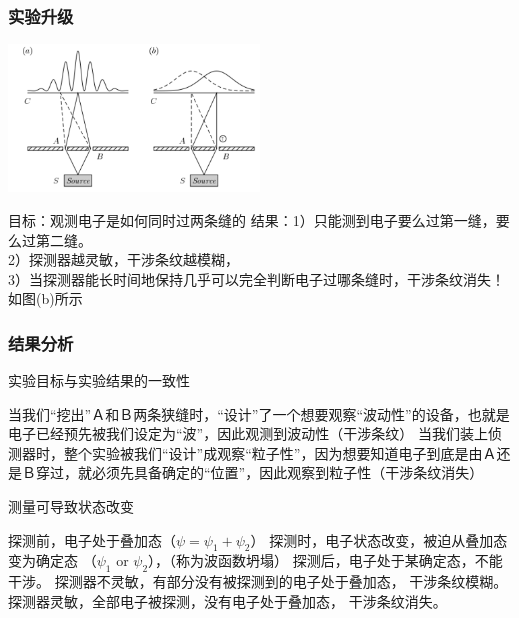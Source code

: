  \begin{frame}
     \frametitle{实验升级}
     \begin{center}
         \includegraphics[width=0.5\textwidth]{figs/sup-4.png} \\
     \end{center} 
     \begin{itemize}
         \Item 目标：观测电子是如何同时过两条缝的
         \Item 结果：1）只能测到电子要么过第一缝，要么过第二缝。\\
         2）探测器越灵敏，干涉条纹越模糊，\\
         3）当探测器能长时间地保持几乎可以完全判断电子过哪条缝时，干涉条纹消失！如图(b)所示
     \end{itemize}
 \end{frame}
 
 \begin{frame} 
     \frametitle{结果分析}
     \begin{enumerate}
         \Item 实验目标与实验结果的一致性\\
         \begin{itemize}
             \IItem 当我们“挖出”Ａ和Ｂ两条狭缝时，“设计”了一个想要观察“波动性”的设备，也就是电子已经预先被我们设定为“波”，因此观测到波动性（干涉条纹）
             \IItem 当我们装上侦测器时，整个实验被我们“设计”成观察“粒子性”，因为想要知道电子到底是由Ａ还是Ｂ穿过，就必须先具备确定的“位置”，因此观察到粒子性（干涉条纹消失）
         \end{itemize}
         \Item 测量可导致状态改变\\
         \begin{itemize}
             \IItem 探测前，电子处于叠加态（$ \psi =\psi_1+\psi_2$）
             \IItem 探测时，电子状态改变，被迫从叠加态变为确定态 （$\psi_1$ or $\psi_2$），（称为波函数坍塌）
             \IItem 探测后，电子处于某确定态，不能干涉。
             \IItem 探测器不灵敏，有部分没有被探测到的电子处于叠加态， 干涉条纹模糊。
             \IItem 探测器灵敏，全部电子被探测，没有电子处于叠加态， 干涉条纹消失。
         \end{itemize}
     \end{enumerate}
 \end{frame}
 
